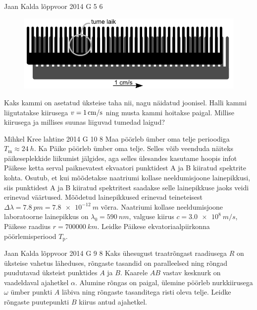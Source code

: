 \documentclass[11pt]{article}
\begin{document}
{%
{Jaan Kalda} %
{lõppvoor} %
{2014} %
{G 5} %
{6} %
{
\ifStatement
\begin{figure}%
\includegraphics[width=1\linewidth]{2014-v3g-05-kammid}
\end{figure}

Kaks kammi on asetatud üksteise taha nii, nagu näidatud joonisel. Halli kammi liigutatakse kiirusega $v=\SI 1{cm/s}$ ning musta kammi hoitakse paigal. Millise kiirusega ja millises suunas liiguvad tumedad laigud?
\fi
}

{Mihkel Kree} %
{lahtine} %
{2014} %
{G 10} %
{8} %
{
\ifStatement
Maa pöörleb ümber oma telje perioodiga $T_\text{m}\approx\SI{24}{h}$. Ka Päike pöörleb ümber oma telje. Selles võib veenduda näiteks päikeseplekkide liikumist jälgides, aga selles ülesandes kasutame hoopis infot Päikese ketta serval paiknevatest ekvaatori punktidest A ja B kiiratud spektrite kohta. Osutub, et kui mõõdetakse naatriumi kollase neeldumisjoone lainepikkusi, siis punktidest A ja B kiiratud spektritest saadakse selle lainepikkuse jaoks veidi erinevad väärtused. Mõõdetud lainepikkused erinevad teineteisest $\Delta \lambda = \SI{7.8}{pm}=\SI{7.8e-12}{m}$ võrra. Naatriumi kollase neeldumisjoone laboratoorne lainepikkus on $\lambda_0=\SI{590}{nm}$, valguse kiirus $c=\SI{3.0e8}{m/s}$, Päikese raadius $r=\SI{700000}{km}$. Leidke Päikese ekvatoriaalpiirkonna pöörlemisperiood $T_\text{p}$.
\fi
}

{Jaan Kalda} %
{lõppvoor} %
{2014} %
{G 9} %
{8} %
{
\ifStatement
Kaks ühesugust traatrõngast raadiusega $R$ on üksteise vahetus läheduses, rõngaste tasandid on paralleelsed ning rõngad puudutavad üksteist punktides $A$ ja $B$. Kaarele $AB$ vastav kesknurk on vaadeldaval ajahetkel $\alpha$. Alumine rõngas on paigal, ülemine pöörleb nurkkiirusega $\omega$ ümber punkti $A$ läbiva ning rõngaste tasanditega risti oleva telje. Leidke rõngaste puutepunkti $B$ kiirus antud ajahetkel.
\fi
}

}
\end{document}
